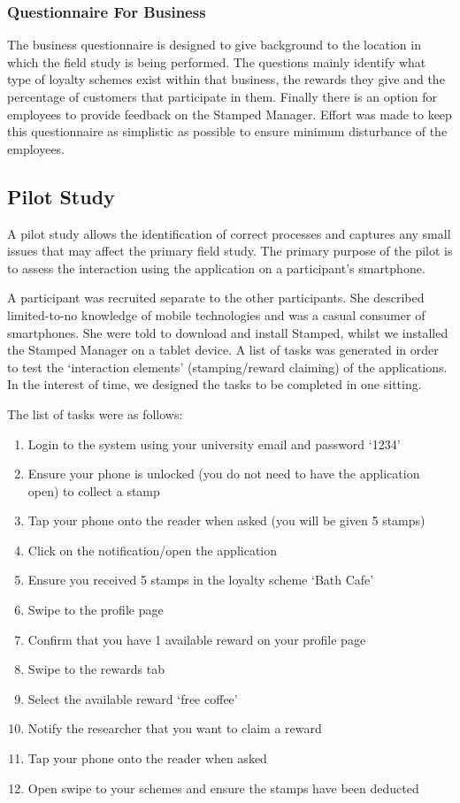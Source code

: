 \subsubsection{Questionnaire For Business}
The business questionnaire is designed to give background to the location in which the field study is being performed. The questions mainly identify what type of loyalty schemes exist within that business, the rewards they give and the percentage of customers that participate in them. Finally there is an option for employees to provide feedback on the Stamped Manager. Effort was made to keep this questionnaire as simplistic as possible to ensure minimum disturbance of the employees.

\subsection{Pilot Study}
\label{sec:pilotStudy}
A pilot study allows the identification of correct processes and captures any small issues that may affect the primary field study. The primary purpose of the pilot is to assess the interaction using the application on a participant's smartphone.

A participant was recruited separate to the other participants. She described limited-to-no knowledge of mobile technologies and was a casual consumer of smartphones. She were told to download and install Stamped, whilst we installed the Stamped Manager on a tablet device. A list of tasks was generated in order to test the `interaction elements' (stamping/reward claiming) of the applications. In the interest of time, we designed the tasks to be completed in one sitting.

The list of tasks were as follows:

\begin{enumerate}
  \item Login to the system using your university email and password `1234'
  \item Ensure your phone is unlocked (you do not need to have the application open) to collect a stamp
  \item Tap your phone onto the reader when asked (you will be given 5 stamps)
  \item Click on the notification/open the application
  \item Ensure you received 5 stamps in the loyalty scheme `Bath Cafe'
  \item Swipe to the profile page
  \item Confirm that you have 1 available reward on your profile page
  \item Swipe to the rewards tab
  \item Select the available reward `free coffee'
  \item Notify the researcher that you want to claim a reward
  \item Tap your phone onto the reader when asked
  \item Open swipe to your schemes and ensure the stamps have been deducted
\end{enumerate}

